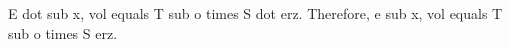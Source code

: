 E dot sub x, vol equals T sub o times S dot erz. Therefore, e sub x, vol equals T sub o times S erz.